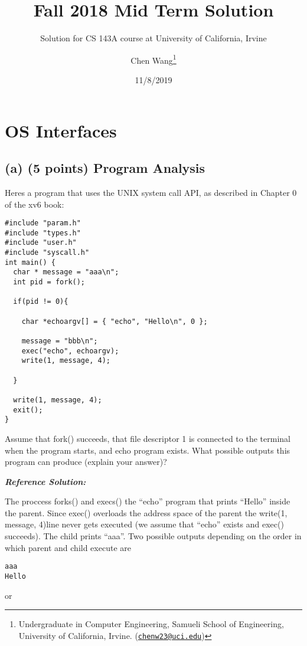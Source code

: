 \documentclass[]{article}
\title{Fall 2018 Mid Term Solution}
\subtitle{Solution for CS 143A course at University of California, Irvine}
\author{Chen Wang\footnote{Undergraduate in Computer Engineering, Samueli School
  of Engineering, University of California, Irvine.
  (\href{mailto:chenw23@uci.edu}{\nolinkurl{chenw23@uci.edu}})}}
\date{11/8/2019}
\begin{document}
\maketitle

{
\setcounter{tocdepth}{3}
\tableofcontents
}
\hypertarget{os-interfaces}{%
\section{OS Interfaces}\label{os-interfaces}}

\hypertarget{a-5-points-program-analysis}{%
\subsection{(a) (5 points) Program
Analysis}\label{a-5-points-program-analysis}}

Heres a program that uses the UNIX system call API, as described in
Chapter 0 of the xv6 book:

\begin{verbatim}
#include "param.h"
#include "types.h"
#include "user.h"
#include "syscall.h"
int main() {
  char * message = "aaa\n";
  int pid = fork();
  
  if(pid != 0){
  
    char *echoargv[] = { "echo", "Hello\n", 0 };
    
    message = "bbb\n";
    exec("echo", echoargv);
    write(1, message, 4);
    
  }
  
  write(1, message, 4);
  exit();
}
\end{verbatim}

Assume that fork() succeeds, that file descriptor 1 is connected to the
terminal when the program starts, and echo program exists. What possible
outputs this program can produce (explain your answer)?

\textbf{\emph{Reference Solution:}}

The proccess forks() and execs() the ``echo'' program that prints
``Hello'' inside the parent. Since exec() overloads the address space of
the parent the write(1, message, 4)line never gets executed (we assume
that ``echo'' exists and exec() succeeds). The child prints ``aaa''. Two
possible outputs depending on the order in which parent and child
execute are

\begin{verbatim}
aaa
Hello
\end{verbatim}

or
\end{document}
